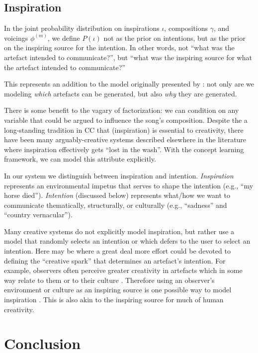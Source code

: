\documentclass[letterpaper]{article}
\begin{document}
\subsection{Inspiration}

In the joint probability distribution on inspirations $\iota$, compositions $\gamma$, and voicings $\phi^{(m)}$, we define $P(\iota)$ not as the prior on intentions, but as the prior on the inspiring source for the intention. In other words, not ``what was the artefact intended to communicate?'', but ``what was the inspiring source for what the artefact intended to communicate?''

This represents an addition to the model originally presented by \cite{Lake et all}: not only are we modeling \textit{which} artefacts can be generated, but also \textit{why} they are generated. 

There is some benefit to the vagary of factorization: we can condition on any variable that could be argued to influence the song's composition. Despite the a long-standing tradition in CC that (inspiration) is essential to creativity, there have been many arguably-creative systems described elsewhere in the literature where inspiration effectively gets ``lost in the wash''. With the concept learning framework, we can model this attribute explicitly.

In our system we distinguish between inspiration and intention. \textit{Inspiration} represents an environmental impetus that serves to shape the intention (e.g., ``my horse died''). \textit{Intention} (discussed below) represents what/how we want to communicate thematically, structurally, or culturally (e.g., ``sadness'' and ``country vernacular'').

Many creative systems do not explicitly model inspiration, but rather use a model that randomly selects an intention or which defers to the user to select an intention. Here may be where a great deal more effort could be devoted to defining the ``creative spark'' that determines an artefact's intention. For example, observers often perceive greater creativity in artefacts which in some way relate to them or to their culture \cite{colton}. Therefore using an observer's environment or culture as an inspiring source is one possible way to model inspiration \cite{paper dad sent about brain waves}. This is also akin to the inspiring source for much of human creativity.

\section{Conclusion}



\end{document}
